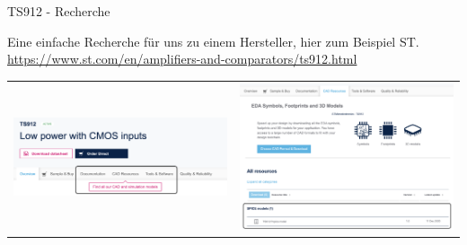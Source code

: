\begin{frame}[t]{TS912 - Recherche} 

    Eine einfache Recherche für uns zu einem Hersteller, hier zum Beispiel ST.
    \href{https://www.st.com/en/amplifiers-and-comparators/ts912.html}{https://www.st.com/en/amplifiers-and-comparators/ts912.html}


    \begin{spacing}{0.9} \begin{tiny}
        \begin{table}[h!]
          \begin{tabular}{p{5cm} p{5cm}}
              \begin{minipage}{0.5\textwidth}
                  \includegraphics[width=\linewidth]{pictures/spice_model_search.png}
              \end{minipage} 
              &
              \begin{minipage}{0.5\textwidth}
                  \includegraphics[width=\linewidth]{pictures/spice_model_search2.png}
              \end{minipage} 
        \end{tabular}
      \end{table}
      \end{tiny} \end{spacing}

\end{frame}

